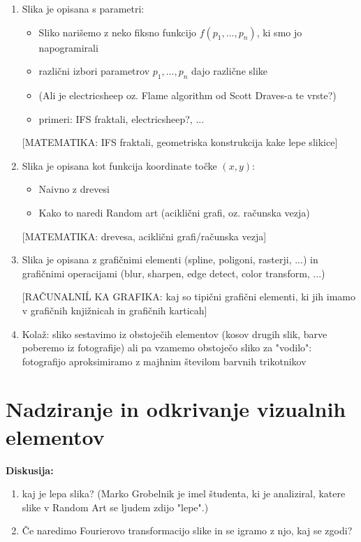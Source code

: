 \begin{enumerate}
  \item Slika je opisana s parametri:
    \begin{itemize}
      \item Sliko narišemo z neko fiksno funkcijo $f(p_1, ..., p_n)$, ki smo jo napogramirali
      \item različni izbori parametrov $p_1, ..., p_n$ dajo različne slike
      \item (Ali je electricsheep oz. Flame algorithm od Scott Draves-a te vrste?)
      \item primeri: IFS fraktali, electricsheep?, ...
    \end{itemize}
    
  [MATEMATIKA: IFS fraktali, geometriska konstrukcija kake lepe slikice]

  \item Slika je opisana kot funkcija koordinate točke $(x,y)$:
    \begin{itemize}
      \item Naivno z drevesi
      \item Kako to naredi Random art (aciklični grafi, oz. računska vezja)
    \end{itemize}
    
   [MATEMATIKA: drevesa, aciklični grafi/računska vezja]

  \item Slika je opisana z grafičnimi elementi (spline, poligoni, rasterji, ...) in grafičnimi operacijami (blur, sharpen, edge detect, color transform, ...)

   [RAČUNALNIĹ KA GRAFIKA: kaj so tipični grafični elementi, ki jih imamo v grafičnih knjižnicah in grafičnih karticah]

\item Kolaž: sliko sestavimo iz obstoječih elementov (kosov drugih slik, barve poberemo iz fotografije) ali pa vzamemo obstoječo sliko za "vodilo": fotografijo aproksimiramo z majhnim številom barvnih trikotnikov
\end{enumerate}

\chapter{Nadziranje in odkrivanje vizualnih elementov}

\textbf{Diskusija:}
\begin{enumerate}
  \item kaj je lepa slika? (Marko Grobelnik je imel študenta, ki je analiziral, katere slike v Random Art se ljudem zdijo "lepe".)
  \item Če naredimo Fourierovo transformacijo slike in se igramo z njo, kaj se zgodi?
\end{enumerate}

